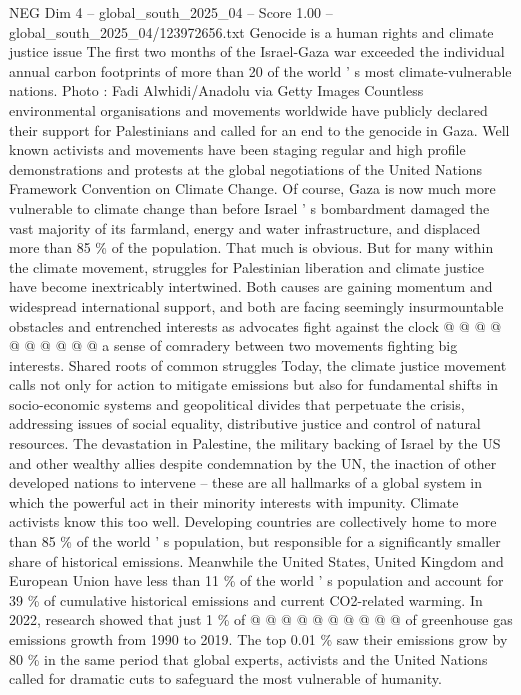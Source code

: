 \begin{textsample}{NEG Dim 4 – global\_south\_2025\_04 – Score 1.00 – global\_south\_2025\_04/123972656.txt}  \label{ex:f4_neg_220}
Genocide is a human rights and climate justice issue The first two months of the Israel-Gaza war exceeded the individual annual carbon footprints of more than 20 of the world ' s most climate-vulnerable nations.
Photo : Fadi Alwhidi/Anadolu via Getty Images Countless environmental organisations and movements worldwide have publicly declared their support for Palestinians and called for an end to the genocide in Gaza.
Well known activists and movements have been staging regular and high profile demonstrations and protests at the global negotiations of the United Nations Framework Convention on Climate Change.
Of course, Gaza is now much more vulnerable to climate change than before Israel ' s bombardment damaged the vast majority of its farmland, energy and water infrastructure, and displaced more than 85 \% of the population.
That much is obvious.
But for many within the climate movement, struggles for Palestinian liberation and climate justice have become inextricably intertwined.
Both causes are gaining momentum and widespread international support, and both are facing seemingly insurmountable obstacles and entrenched interests as advocates fight against the clock @ @ @ @ @ @ @ @ @ @ a sense of comradery between two movements fighting big interests.
Shared roots of common struggles Today, the climate justice movement calls not only for action to mitigate emissions but also for fundamental shifts in socio-economic systems and geopolitical divides that perpetuate the crisis, addressing issues of social equality, distributive justice and control of natural resources.
The devastation in Palestine, the military backing of Israel by the US and other wealthy allies despite condemnation by the UN, the inaction of other developed nations to intervene -- these are all hallmarks of a global system in which the powerful act in their minority interests with impunity.
Climate activists know this too well.
Developing countries are collectively home to more than 85 \% of the world ' s population, but responsible for a significantly smaller share of historical emissions.
Meanwhile the United States, United Kingdom and European Union have less than 11 \% of the world ' s population and account for 39 \% of cumulative historical emissions and current CO2-related warming.
In 2022, research showed that just 1 \% of @ @ @ @ @ @ @ @ @ @ of greenhouse gas emissions growth from 1990 to 2019.
The top 0.01 \% saw their emissions grow by 80 \% in the same period that global experts, activists and the United Nations called for dramatic cuts to safeguard the most vulnerable of humanity.

\end{textsample}
